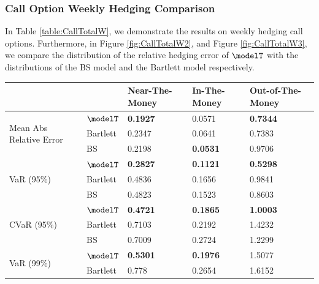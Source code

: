 \subsubsection{Call Option Weekly Hedging Comparison}
In Table \ref{table:CallTotalW}, we demonstrate the results on weekly hedging call options. Furthermore, in  Figure \ref{fig:CallTotalW2}, and  Figure \ref{fig:CallTotalW3}, we compare the distribution of the relative hedging error of $\modelT$ with the distributions of the BS model and the Bartlett model respectively.
\begin{table}[htp!]
	\centering
	\begin{tabular}{ll|l|l|l|}
		\cline{3-5}
		&          & Near-The-Money   & In-The-Money     & Out-of-The-Money \\ \hline
		\multicolumn{1}{|l|}{\multirow{3}{*}{Mean Abs Relative Error}} & $\modelT$    & \textbf{0.1927}  & 0.0571  & \textbf{0.7344}  \\  
		\multicolumn{1}{|l|}{}                                & Bartlett & 0.2347           & 0.0641           & 0.7383           \\  
		\multicolumn{1}{|l|}{}                                & BS       & 0.2198           &\textbf{0.0531}           & 0.9706           \\ \hline
		\multicolumn{1}{|l|}{\multirow{3}{*}{VaR (95\%)}}     & $\modelT$    & \textbf{0.2827} & \textbf{0.1121} & \textbf{0.5298} \\  
		\multicolumn{1}{|l|}{}                                & Bartlett & 0.4836          & 0.1656          & 0.9841          \\  
		\multicolumn{1}{|l|}{}                                & BS       & 0.4823          & 0.1523          & 0.8603          \\ \hline
		\multicolumn{1}{|l|}{\multirow{3}{*}{CVaR (95\%)}}    & $\modelT$    & \textbf{0.4721} & \textbf{0.1865} & \textbf{1.0003} \\  
		\multicolumn{1}{|l|}{}                                & Bartlett & 0.7103          & 0.2192          & 1.4232          \\  
		\multicolumn{1}{|l|}{}                                & BS       & 0.7009          & 0.2724          & 1.2299          \\ \hline
		\multicolumn{1}{|l|}{\multirow{3}{*}{VaR (99\%)}}     & $\modelT$    & \textbf{0.5301} & \textbf{0.1976} & 1.5077          \\  
		\multicolumn{1}{|l|}{}                                & Bartlett & 0.778           & 0.2654          & 1.6152          \\  

\end{tabular}
\end{table}
